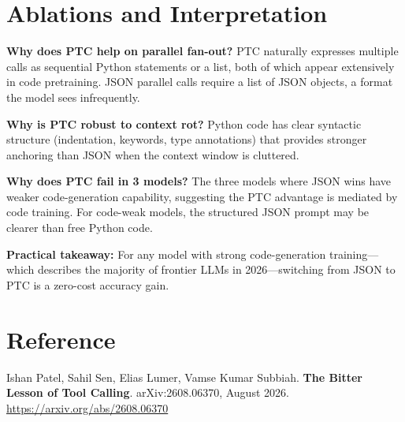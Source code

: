\documentclass[10pt,twocolumn]{article}
\begin{document}
\section{Ablations and Interpretation}

\textbf{Why does PTC help on parallel fan-out?}
PTC naturally expresses multiple calls as sequential Python statements or a list,
both of which appear extensively in code pretraining. JSON parallel calls require
a list of JSON objects, a format the model sees infrequently.

\textbf{Why is PTC robust to context rot?}
Python code has clear syntactic structure (indentation, keywords, type annotations)
that provides stronger anchoring than JSON when the context window is cluttered.

\textbf{Why does PTC fail in 3 models?}
The three models where JSON wins have weaker code-generation capability, suggesting
the PTC advantage is mediated by code training. For code-weak models, the structured
JSON prompt may be clearer than free Python code.

\textbf{Practical takeaway:}
For any model with strong code-generation training---which describes the majority
of frontier LLMs in 2026---switching from JSON to PTC is a zero-cost accuracy gain.

\section*{Reference}

Ishan Patel, Sahil Sen, Elias Lumer, Vamse Kumar Subbiah.
\textbf{The Bitter Lesson of Tool Calling}.
arXiv:2608.06370, August 2026.
\url{https://arxiv.org/abs/2608.06370}
\end{document}
